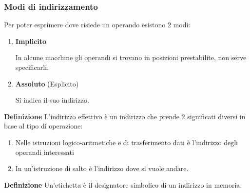 \documentclass{article}
\begin{document}
\subsubsection{Modi di indirizzamento}

Per poter esprimere dove risiede un operando esistono 2 modi:
\begin{enumerate}

    \item \textbf{Implicito}

        In alcune macchine gli operandi si trovano in posizioni prestabilite, non serve specificarli.

    \item \textbf{Assoluto} (Esplicito)

        Si indica il suo indirizzo.

\end{enumerate}

\vspace{5pt}

\noindent\textbf{Definizione} L'indirizzo effettivo è un indirizzo che prende 2 significati diversi in base al tipo di operazione:
\begin{enumerate}
    \item Nelle istruzioni logico-aritmetiche e di trasferimento dati è l'indirizzo degli operandi interessati
    \item In un'istruzione di salto è l'indirizzo dove si vuole andare.
\end{enumerate}

\vspace{5pt}

\noindent\textbf{Definizione} Un'etichetta è il designatore simbolico di un indirizzo in memoria.\newline
\end{document}

